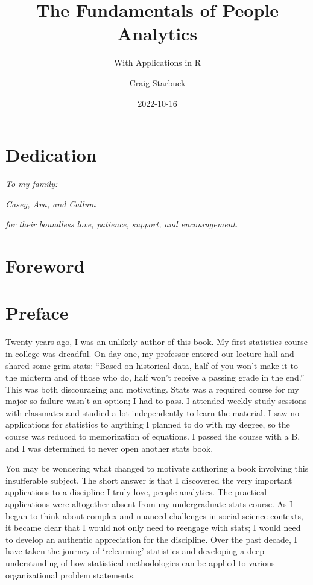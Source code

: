 \documentclass[
]{book}
\title{The Fundamentals of People Analytics}
\subtitle{With Applications in R}
\author{Craig Starbuck}
\date{2022-10-16}
\begin{document}
\maketitle

{
\setcounter{tocdepth}{1}
\tableofcontents
}
\hypertarget{dedication}{%
\chapter*{Dedication}\label{dedication}}

\emph{To my family:}

\emph{Casey, Ava, and Callum}

\emph{for their boundless love, patience, support, and encouragement.}

\hypertarget{foreword}{%
\chapter*{Foreword}\label{foreword}}

\hypertarget{preface}{%
\chapter*{Preface}\label{preface}}

Twenty years ago, I was an unlikely author of this book. My first statistics course in college was dreadful. On day one, my professor entered our lecture hall and shared some grim stats: ``Based on historical data, half of you won't make it to the midterm and of those who do, half won't receive a passing grade in the end.'' This was both discouraging and motivating. Stats was a required course for my major so failure wasn't an option; I had to pass. I attended weekly study sessions with classmates and studied a lot independently to learn the material. I saw no applications for statistics to anything I planned to do with my degree, so the course was reduced to memorization of equations. I passed the course with a B, and I was determined to never open another stats book.

You may be wondering what changed to motivate authoring a book involving this insufferable subject. The short answer is that I discovered the very important applications to a discipline I truly love, people analytics. The practical applications were altogether absent from my undergraduate stats course. As I began to think about complex and nuanced challenges in social science contexts, it became clear that I would not only need to reengage with stats; I would need to develop an authentic appreciation for the discipline. Over the past decade, I have taken the journey of `relearning' statistics and developing a deep understanding of how statistical methodologies can be applied to various organizational problem statements.
\end{document}

